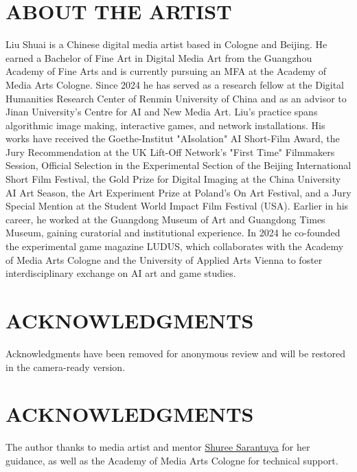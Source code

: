 \documentclass[sigconf]{acmart} %
\begin{document}
  \section{ABOUT THE ARTIST}
  Liu Shuai is a Chinese digital media artist based in Cologne and Beijing. He earned a Bachelor of Fine Art in Digital Media Art from the Guangzhou Academy of Fine Arts and is currently pursuing an MFA at the Academy of Media Arts Cologne. Since 2024 he has served as a research fellow at the Digital Humanities Research Center of Renmin University of China and as an advisor to Jinan University's Centre for AI and New Media Art. Liu's practice spans algorithmic image making, interactive games, and network installations. His works have received the Goethe-Institut "AIsolation" AI Short-Film Award, the Jury Recommendation at the UK Lift-Off Network's "First Time" Filmmakers Session, Official Selection in the Experimental Section of the Beijing International Short Film Festival, the Gold Prize for Digital Imaging at the China University AI Art Season, the Art Experiment Prize at Poland's On Art Festival, and a Jury Special Mention at the Student World Impact Film Festival (USA). Earlier in his career, he worked at the Guangdong Museum of Art and Guangdong Times Museum, gaining curatorial and institutional experience. In 2024 he co-founded the experimental game magazine LUDUS, which collaborates with the Academy of Media Arts Cologne and the University of Applied Arts Vienna to foster interdisciplinary exchange on AI art and game studies.
\fi

\ifanonymousmode
  \section*{ACKNOWLEDGMENTS}
  Acknowledgments have been removed for anonymous review and will be restored in the camera-ready version.
\else
  \section*{ACKNOWLEDGMENTS}
  The author thanks to media artist and mentor \href{https://shureesarantuya.com/}{Shuree Sarantuya} for her guidance, as well as the Academy of Media Arts Cologne for technical support.
\fi


\end{document}
